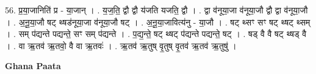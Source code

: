 \documentclass[17pt]{extarticle}
\begin{document}
56. प्र॒या॒जानिति॑ प्र - या॒जान् । . य॒ज॒ति॒ द्वौ द्वौ य॑जति यजति॒ द्वौ । . द्वा व॑नूया॒जा व॑नूया॒जौ द्वौ द्वा व॑नूया॒जौ । . अ॒नू॒या॒जौ षट् थ्षड॑नूया॒जा व॑नूया॒जौ षट् । . अ॒नू॒या॒जावित्य॑नु - या॒जौ । . षट् थ्सꣳ सꣳ षट् थ्षट् थ्सम् । . सम् प॑द्यन्ते पद्यन्ते॒ सꣳ सम् प॑द्यन्ते । . प॒द्य॒न्ते॒ षट् थ्षट् प॑द्यन्ते पद्यन्ते॒ षट् । . षड् वै वै षट् थ्षड् वै । . वा ऋ॒तव॑ ऋ॒तवो॒ वै वा ऋ॒तवः॑ । . ऋ॒तव॑ ऋ॒तुष् वृ॒तुष् वृ॒तव॑ ऋ॒तव॑ ऋ॒तुषु॑ । \newline

\textbf{Ghana Paata } \newline
\end{document}
